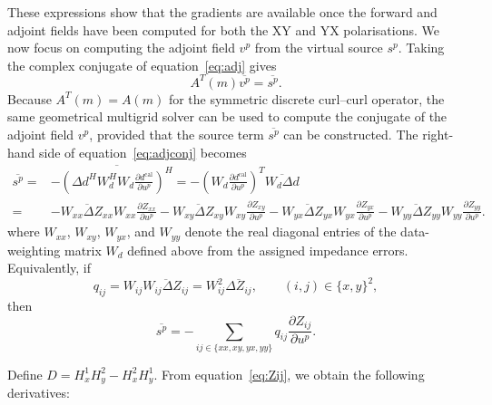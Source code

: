 \documentclass{article}
\begin{document}
These expressions show that the gradients are available once the forward and adjoint fields have been computed for both the XY and YX polarisations. We now focus on computing the adjoint field $v^p$ from the virtual source $s^p$. Taking the complex conjugate of equation~\eqref{eq:adj} gives
\begin{equation}\label{eq:adjconj}
A^T(m) \overline{v^p}=\overline{s^p}.
\end{equation}
Because $A^T(m)=A(m)$ for the symmetric discrete curl--curl operator, the same geometrical multigrid solver can be used to compute the conjugate of the adjoint field $v^p$, provided that the source term $\overline{s^p}$ can be constructed. The right-hand side of equation~\eqref{eq:adjconj} becomes
\begin{equation}
  \begin{aligned}
  \overline{s^p}=&-\overline{(\Delta d^H W_d^H W_d \frac{\partial d^{\mathrm{cal}}}{\partial u^p})^H}
  =-( W_d\frac{\partial d^{\mathrm{cal}}}{\partial u^p})^T \overline{W_d \Delta d}\\
  =&-\overline{W_{xx}\Delta Z_{xx}} W_{xx}\frac{\partial Z_{xx}}{\partial u^p}
 -\overline{W_{xy}\Delta Z_{xy}}W_{xy}\frac{\partial Z_{xy}}{\partial u^p}
  -\overline{W_{yx}\Delta Z_{yx}} W_{yx}\frac{\partial Z_{yx}}{\partial u^p}
  -\overline{W_{yy}\Delta Z_{yy}}W_{yy}\frac{\partial Z_{yy}}{\partial u^p}.
  \end{aligned}
\end{equation}
where $W_{xx}$, $W_{xy}$, $W_{yx}$, and $W_{yy}$ denote the real diagonal entries of the data-weighting matrix $W_d$ defined above from the assigned impedance errors. Equivalently, if
\begin{equation}
q_{ij}=W_{ij}\overline{W_{ij}\Delta Z_{ij}}=W_{ij}^2\overline{\Delta Z_{ij}},\qquad (i,j)\in\{x,y\}^2,
\end{equation}
then
\begin{equation}\label{eq:adjoint-source-compact}
\overline{s^p}=-\sum_{ij\in\{xx,xy,yx,yy\}} q_{ij}\frac{\partial Z_{ij}}{\partial u^p}.
\end{equation}

Define $D = H_x^1 H_y^2 - H_x^2 H_y^1$. From equation~\eqref{eq:Zij}, we obtain the following derivatives:
\end{document}
